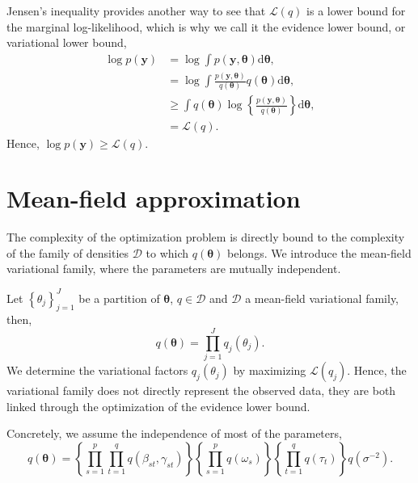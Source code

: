 \documentclass[a4paper, 11pt]{report}
\numberwithin{equation}{chapter}
\begin{document}
Jensen's inequality provides another way to see that $\mathcal{L}(q)$ is a lower bound for the marginal log-likelihood, which is why we call it the evidence lower bound, or variational lower bound,
\begin{align*}
\log p(\boldsymbol{y}) &= \log \int p(\boldsymbol{y}, \boldsymbol{\theta}) \mathrm{d}\boldsymbol{\theta},\\
&= \log \int \frac{p(\boldsymbol{y}, \boldsymbol{\theta})}{q(\boldsymbol{\theta})}q(\boldsymbol{\theta})\mathrm{d}\boldsymbol{\theta}
,\\
&\geq \int q(\boldsymbol{\theta}) \log \left\lbrace \frac{p(\boldsymbol{y}, \boldsymbol{\theta})}{q(\boldsymbol{\theta})} \right\rbrace \mathrm{d}\boldsymbol{\theta},\\
&= \mathcal{L}(q).
\end{align*}
Hence, $\log p(\boldsymbol{y}) \geq \mathcal{L}(q)$.

\section{Mean-field approximation}
The complexity of the optimization problem is directly bound to the complexity of the family of densities $\mathcal{D}$ to which $q(\boldsymbol{\theta})$ belongs. We introduce the mean-field variational family, where the parameters are mutually independent.

Let $\left\lbrace \theta_j\right\rbrace_{j=1}^J$ be a partition of $\boldsymbol{\theta}$, $q \in \mathcal{D}$ and $\mathcal{D}$ a mean-field variational family, then,
\begin{equation*}
q(\boldsymbol{\theta}) = \prod_{j=1}^J q_j(\theta_j).
\end{equation*}
We determine the variational factors $q_j(\theta_j)$ by maximizing $\mathcal{L}(q_j)$. Hence, the variational family does not directly represent the observed data, they are both linked through the optimization of the evidence lower bound.

Concretely, we assume the independence of most of the parameters,
\begin{equation*}
q(\boldsymbol{\theta}) =\left\lbrace\prod_{s=1}^p \prod_{t=1}^q q(\beta_{st}, \gamma_{st})\right\rbrace \left\lbrace\prod_{s=1}^p  q(\omega_s)\right\rbrace \left\lbrace\prod_{t=1}^q q(\tau_t)\right\rbrace q(\sigma^{-2}).
\end{equation*}
\end{document}
